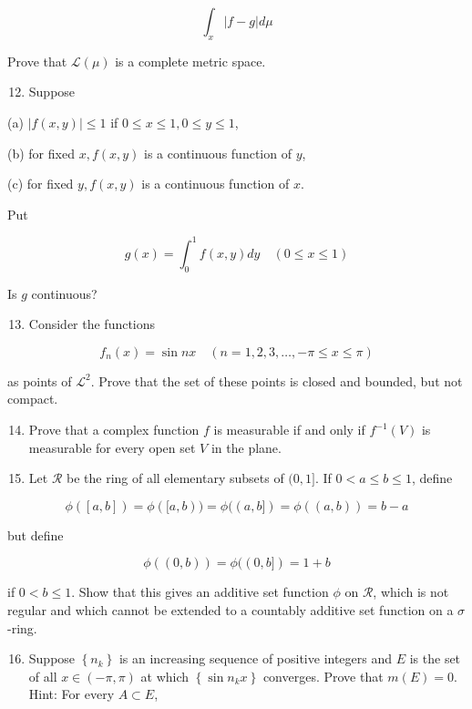 \documentclass[10pt]{article}
\begin{document}
$$
\int_{x}|f-g| d \mu
$$

Prove that $\mathscr{L}(\mu)$ is a complete metric space.

\begin{enumerate}
  \setcounter{enumi}{11}
  \item Suppose
\end{enumerate}

(a) $|f(x, y)| \leq 1$ if $0 \leq x \leq 1,0 \leq y \leq 1$,

(b) for fixed $x, f(x, y)$ is a continuous function of $y$,

(c) for fixed $y, f(x, y)$ is a continuous function of $x$.

Put

$$
g(x)=\int_{0}^{1} f(x, y) d y \quad(0 \leq x \leq 1)
$$

Is $g$ continuous?

\begin{enumerate}
  \setcounter{enumi}{12}
  \item Consider the functions
\end{enumerate}

$$
f_{n}(x)=\sin n x \quad(n=1,2,3, \ldots,-\pi \leq x \leq \pi)
$$

as points of $\mathscr{L}^{2}$. Prove that the set of these points is closed and bounded, but not compact.

\begin{enumerate}
  \setcounter{enumi}{13}
  \item Prove that a complex function $f$ is measurable if and only if $f^{-1}(V)$ is measurable for every open set $V$ in the plane.

  \item Let $\mathscr{R}$ be the ring of all elementary subsets of $(0,1]$. If $0<a \leq b \leq 1$, define

\end{enumerate}

$$
\phi([a, b])=\phi([a, b))=\phi((a, b])=\phi((a, b))=b-a
$$

but define

$$
\phi((0, b))=\phi((0, b])=1+b
$$

if $0<b \leq 1$. Show that this gives an additive set function $\phi$ on $\mathscr{R}$, which is not regular and which cannot be extended to a countably additive set function on a $\sigma$-ring.

\begin{enumerate}
  \setcounter{enumi}{15}
  \item Suppose $\left\{n_{k}\right\}$ is an increasing sequence of positive integers and $E$ is the set of all $x \in(-\pi, \pi)$ at which $\left\{\sin n_{k} x\right\}$ converges. Prove that $m(E)=0$. Hint: For every $A \subset E$,
\end{enumerate}
\end{document}
